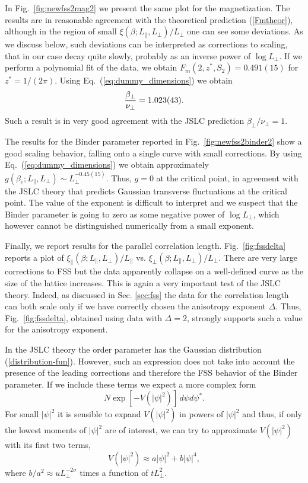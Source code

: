 \documentclass[12pt]{article}
\begin{document}
In Fig.~\ref{fig:newfss2mag2} we present the same plot for the 
magnetization. The results are in reasonable agreement with the 
theoretical prediction (\ref{Fmtheor}), although in the 
region of small $\xi(\beta;L_\|,L_\bot)/L_\bot$ one can see some deviations.
As we discuss below, such deviations can be interpreted as corrections to 
scaling, that in our case decay quite slowly, probably as an inverse power 
of $\log L_\bot$.  If we perform a polynomial fit of the data, we obtain 
$F_m(2,z^*,S_2) = 0.491(15)$ for $z^* = 1/(2 \pi)$. 
Using Eq.~(\ref{eq:dummy_dimensions}) we obtain 
\begin{equation}
    {\beta_\bot\over \nu_\bot} = 1.023(43).
\end{equation}
Such a result is in very good agreement with the JSLC prediction
$\beta_\bot/\nu_\bot = 1$. 

The results for the Binder parameter  reported in
Fig.~\ref{fig:newfss2binder2} show a good scaling behavior,
falling onto a single curve with small corrections.
By using Eq.~(\ref{eq:dummy_dimensions}) we obtain
approximately $g(\beta_c;L_\|,L_\bot) \sim L_\bot^{-0.45(15)}$.
Thus, $g=0$ at the critical point, in agreement with the JSLC theory 
that predicts Gaussian transverse fluctuations at the
critical point. The value of the exponent 
is difficult to interpret 
and we suspect that the Binder parameter is going to zero as 
some negative power of $\log L_\bot$, which however cannot be distinguished 
numerically from a small exponent.

Finally, we report 
results for the parallel correlation length. 
Fig.~\ref{fig:fssdelta} reports a plot of 
$\xi_\|(\beta;L_\|,L_\bot)/L_\|$ vs. $\xi_\bot(\beta;L_\|,L_\bot)/L_\bot$. 
There are very large corrections to FSS
but the data apparently collapse on a well-defined curve as the size of the 
lattice increases. This is again a very important test of the JSLC 
theory. Indeed, as discussed in Sec. \ref{sec:fss}
the data for the correlation length can both scale only if 
we have correctly chosen the anisotropy exponent $\Delta$. 
Thus, Fig.~\ref{fig:fssdelta}, obtained using data with $\Delta = 2$,
strongly supports such a value for the anisotropy exponent.

In the JSLC theory the order parameter has the Gaussian distribution 
(\ref{distribution-fun}). However, such an expression does not take 
into account the presence of the leading corrections and therefore 
the FSS behavior of the Binder parameter. If we include these 
terms we expect a more complex form 
\begin{equation}
   N\exp[- V(|\psi|^2)]\, d\psi d\psi^*.
\label{distr-general}
\end{equation}
For small  $|\psi|^2$ it is sensible to expand $V(|\psi|^2)$ in 
powers of $|\psi|^2$ and thus, if only the lowest moments of $|\psi|^2$
are of interest, we can try to approximate $V(|\psi|^2)$ with its 
first two terms, 
\begin{equation}
  V(|\psi|^2) \approx a |\psi|^2 + b |\psi|^4,
\label{V-general}
\end{equation}
where $b/a^2 \approx u L^{-2\sigma}_\bot$ times a function of $tL_\bot^2$. 
\end{document}
